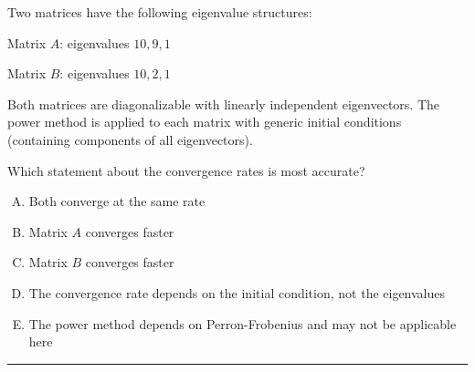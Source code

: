 \documentclass[12pt]{amsart}
\newcommand{\divider}{
  \vspace{-1em} %
  \noindent
  \raisebox{-0.15ex}{\textbullet}%
  \hspace{0.5em}%
  \rule[0.5ex]{0.95\textwidth}{1.0pt}%
  \hspace{0.5em}%
  \raisebox{-0.15ex}{\textbullet}%
  \vspace{0em} %
}
\begin{document}
Two matrices have the following eigenvalue structures:

Matrix $A$: eigenvalues $10, 9, 1$

Matrix $B$: eigenvalues $10, 2, 1$

Both matrices are diagonalizable with linearly independent eigenvectors. The power method is applied to each matrix with generic initial conditions (containing components of all eigenvectors).

Which statement about the convergence rates is most accurate?

\begin{enumerate}[(A)]
\item Both converge at the same rate
\item Matrix $A$ converges faster
\item Matrix $B$ converges faster
\item The convergence rate depends on the initial condition, not the eigenvalues
\item The power method depends on Perron-Frobenius and may not be applicable here
\end{enumerate}


\divider
\end{document}

